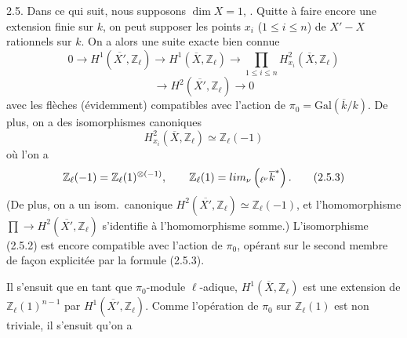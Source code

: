 \documentclass[11pt,a4paper]{article}
\begin{document}
2.5. Dans ce qui suit, nous supposons $\dim X = 1$, . Quitte à faire encore une extension finie sur $k$, on peut supposer les points $x_i$ ($1 \leq i \leq n$) de $X' - X$ rationnels sur $k$. On a alors une suite exacte bien connue
\[
  0 \to H^1(\overline{X'}, \mathbb{Z}_\ell) \to H^1(\overline{X}, \mathbb{Z}_\ell) \to \prod_{1 \leq i \leq n} H^2_{x_i}(\overline{X}, \mathbb{Z}_\ell)
\]
\[
  \to H^2(\overline{X'}, \mathbb{Z}_\ell) \to 0 \tag{2.5.1}
\]
avec les flèches  \struck{\ill{}} (évidemment) compatibles avec l'action de \struck{\ill{}} $\pi_0 = \mathrm{Gal}(\overline{k}/k)$. De plus, on a des isomorphismes canoniques
\[
  H^2_{x_i}(\overline{X}, \mathbb{Z}_\ell) \simeq \mathbb{Z}_\ell(-1) \tag{2.5.2}
\]
où l'on a
\[
  \mathbb{Z}_\ell(-1) = \mathbb{Z}_\ell(1)^{\otimes(-1)}, \qquad \mathbb{Z}_\ell(1) = \varprojlim_\nu \left( {}_{\ell^\nu}\overline{k}^* \right) . \tag{2.5.3}
\]
(De plus, on a un isom.\ canonique $H^2(\overline{X'}, \mathbb{Z}_\ell) \simeq \mathbb{Z}_\ell(-1)$, et l'homomorphisme $\prod \to H^2(\overline{X'}, \mathbb{Z}_\ell)$ s'identifie à l'homomorphisme somme.) L'isomorphisme (2.5.2) est encore compatible avec l'action de $\pi_0$, opérant sur le second membre de façon explicitée par la formule (2.5.3). \struck{\ill{}}

Il s'ensuit que en tant que $\pi_0$-module $\ell$-adique, $H^1(\overline{X}, \mathbb{Z}_\ell)$ est une extension de $\mathbb{Z}_\ell(1)^{n-1}$ par $H^1(\overline{X'}, \mathbb{Z}_\ell)$. Comme l'opération de $\pi_0$ sur $\mathbb{Z}_\ell(1)$ est non triviale, il s'ensuit  qu'on a
\end{document}
